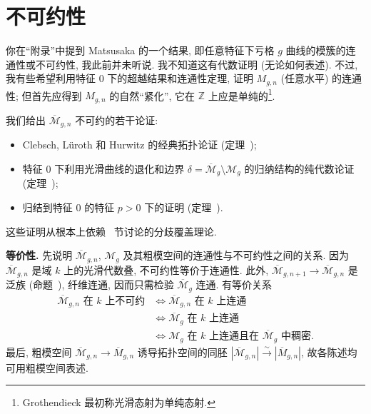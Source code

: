 \section{不可约性}\label{src:6.7}
\begin{epigraph}
你在``附录''中提到 Matsusaka 的一个结果, 即任意特征下亏格 $g$ 曲线的模簇的连通性或不可约性, 我此前并未听说. 我不知道这有代数证明 (无论如何表述). 不过, 我有些希望利用特征 $0$ 下的超越结果和连通性定理, 证明 $M_{g,\allowbreak n}$ (任意水平) 的连通性; 但首先应得到 $M_{g,\allowbreak n}$ 的自然``紧化'', 它在 $\mathbb Z$ 上应是单纯的\footnote{Grothendieck 最初称光滑态射为单纯态射.}.
\end{epigraph}
我们给出 $\overline{\mathcal M}_{g,\allowbreak n}$ 不可约的若干论证:
\begin{itemize}
\item Clebsch, Lüroth 和 Hurwitz 的经典拓扑论证 (定理~);
\item 特征 $0$ 下利用光滑曲线的退化和边界 $\delta=\overline{\mathcal M}_g\setminus\mathcal M_g$ 的归纳结构的纯代数论证 (定理~);
\item 归结到特征 $0$ 的特征 $p>0$ 下的证明 (定理~).
\end{itemize}
这些证明从根本上依赖~ 节讨论的分歧覆盖理论.

\noindent\textbf{等价性.} 先说明 $\overline{\mathcal M}_{g,\allowbreak n}$, $\mathcal M_g$ 及其粗模空间的连通性与不可约性之间的关系. 因为 $\overline{\mathcal M}_{g,\allowbreak n}$ 是域 $k$ 上的光滑代数叠, 不可约性等价于连通性. 此外, $\overline{\mathcal M}_{g,\allowbreak n+1}\to\overline{\mathcal M}_{g,\allowbreak n}$ 是泛族 (命题~), 纤维连通, 因而只需检验 $\overline{\mathcal M}_g$ 连通. 有等价关系
\[
\begin{aligned}
\overline{\mathcal M}_{g,n}\text{ 在 }k\text{ 上不可约}
&\iff\overline{\mathcal M}_{g,n}\text{ 在 }k\text{ 上连通}\\
&\iff\overline{\mathcal M}_g\text{ 在 }k\text{ 上连通}\\
&\iff\mathcal M_g\text{ 在 }k\text{ 上连通且在 }\overline{\mathcal M}_g\text{ 中稠密}.
\end{aligned}
\]
最后, 粗模空间 $\overline{\mathcal M}_{g,\allowbreak n}\to\overline M_{g,\allowbreak n}$ 诱导拓扑空间的同胚 $|\overline{\mathcal M}_{g,\allowbreak n}|\xrightarrow{\sim}|\overline M_{g,\allowbreak n}|$, 故各陈述均可用粗模空间表述.
